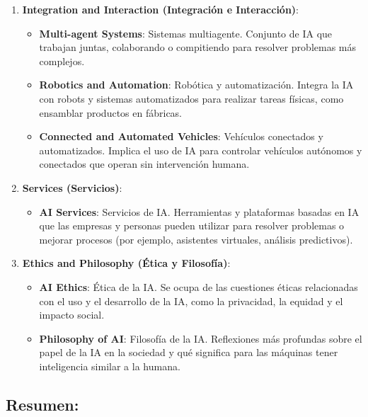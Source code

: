 \documentclass[
  10pt,
  letterpaper,
]{book}
\providecommand{\tightlist}{%
  \setlength{\itemsep}{0pt}\setlength{\parskip}{0pt}}\usepackage{longtable,booktabs,array}
\begin{document}
\begin{enumerate}
\def\labelenumi{\arabic{enumi}.}
\tightlist
\item
  \textbf{Integration and Interaction (Integración e Interacción)}:

  \begin{itemize}
  \tightlist
  \item
    \textbf{Multi-agent Systems}: Sistemas multiagente. Conjunto de IA
    que trabajan juntas, colaborando o compitiendo para resolver
    problemas más complejos.
  \item
    \textbf{Robotics and Automation}: Robótica y automatización. Integra
    la IA con robots y sistemas automatizados para realizar tareas
    físicas, como ensamblar productos en fábricas.
  \item
    \textbf{Connected and Automated Vehicles}: Vehículos conectados y
    automatizados. Implica el uso de IA para controlar vehículos
    autónomos y conectados que operan sin intervención humana.
  \end{itemize}
\item
  \textbf{Services (Servicios)}:

  \begin{itemize}
  \tightlist
  \item
    \textbf{AI Services}: Servicios de IA. Herramientas y plataformas
    basadas en IA que las empresas y personas pueden utilizar para
    resolver problemas o mejorar procesos (por ejemplo, asistentes
    virtuales, análisis predictivos).
  \end{itemize}
\item
  \textbf{Ethics and Philosophy (Ética y Filosofía)}:

  \begin{itemize}
  \tightlist
  \item
    \textbf{AI Ethics}: Ética de la IA. Se ocupa de las cuestiones
    éticas relacionadas con el uso y el desarrollo de la IA, como la
    privacidad, la equidad y el impacto social.
  \item
    \textbf{Philosophy of AI}: Filosofía de la IA. Reflexiones más
    profundas sobre el papel de la IA en la sociedad y qué significa
    para las máquinas tener inteligencia similar a la humana.
  \end{itemize}
\end{enumerate}

\subsection{Resumen:}\label{resumen}
\end{document}
